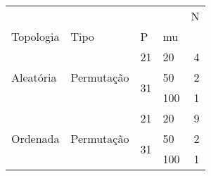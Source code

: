 \begin{tabular}{llllr}
\toprule
 &  &  &  & N \\
Topologia & Tipo & P & mu &  \\
\midrule
\multirow[t]{3}{*}{Aleatória} & \multirow[t]{3}{*}{Permutação} & 21 & 20 & 4 \\
\cline{3-5}
 &  & \multirow[t]{2}{*}{31} & 50 & 2 \\
 &  &  & 100 & 1 \\
\cline{1-5} \cline{2-5} \cline{3-5}
\multirow[t]{3}{*}{Ordenada} & \multirow[t]{3}{*}{Permutação} & 21 & 20 & 9 \\
\cline{3-5}
 &  & \multirow[t]{2}{*}{31} & 50 & 2 \\
 &  &  & 100 & 1 \\
\cline{1-5} \cline{2-5} \cline{3-5}
\bottomrule
\end{tabular}
